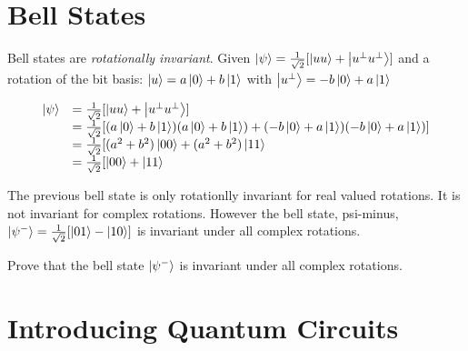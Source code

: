 \section{Bell States}


Bell states are \textit{rotationally invariant}.
Given $\left|\psi\right\rangle = \frac{1}{\sqrt{2}} [\left|uu\right\rangle + \left|u^{\perp}u^{\perp}\right\rangle]$ 
and a rotation of the bit basis:
$\left|u\right\rangle = a\left|0\right\rangle + b\left|1\right\rangle$ with $\left|u^{\perp}\right\rangle = -b\left|0\right\rangle + a\left|1\right\rangle$




\[ \begin{array}{ll}
\left|\psi\right\rangle
& =
\frac{1}{\sqrt{2}} [\left|uu\right\rangle + \left|u^{\perp}u^{\perp}\right\rangle] \\
& =
\frac{1}{\sqrt{2}} [(a\left|0\right\rangle + b\left|1\right\rangle)(a\left|0\right\rangle + b\left|1\right\rangle) 
+ (-b\left|0\right\rangle + a\left|1\right\rangle)(-b\left|0\right\rangle + a\left|1\right\rangle)]  \\ 
& =
\frac{1}{\sqrt{2}} [(a^2 + b^2)\left|00\right\rangle + (a^2 + b^2)\left|11\right\rangle \\ 
& =
\frac{1}{\sqrt{2}} [\left|00\right\rangle + \left|11\right\rangle \\ 
\end{array}\] 

\frmrule

The previous bell state is only rotationlly invariant for real valued rotations. 
It is not invariant for complex rotations. However the bell state, 
psi-minus, $\left|\psi^{-}\right\rangle = \frac{1}{\sqrt{2}} [\left|01\right\rangle - \left|10\right\rangle]$
is invariant under all complex rotations.

\begin{example}
Prove that the bell state $\left|\psi^{-}\right\rangle$ is invariant under all complex rotations.
\end{example}




\section{Introducing Quantum Circuits}



